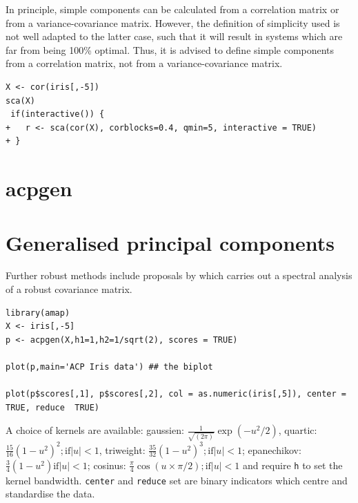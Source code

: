 In principle, simple components can be calculated from a correlation matrix or from a variance-covariance matrix. However, the definition of simplicity used is not well adapted to the latter case, such that it will result in systems which are far from being 100\% optimal. Thus, it is advised to define simple components from a correlation matrix, not from a variance-covariance matrix. 

\singlespacing
\begin{verbatim}
X <- cor(iris[,-5])
sca(X)
 if(interactive()) {
+   r <- sca(cor(X), corblocks=0.4, qmin=5, interactive = TRUE)
+ }
\end{verbatim}
\onehalfspacing

\section{acpgen}

\section{Generalised principal components}

Further robust methods include proposals by \cite{Caussinus+Ruiz-Gazen:1993} which carries out a spectral analysis of a robust covariance matrix.


\singlespacing
\begin{verbatim}
library(amap)
X <- iris[,-5]
p <- acpgen(X,h1=1,h2=1/sqrt(2), scores = TRUE)

plot(p,main='ACP Iris data') ## the biplot

plot(p$scores[,1], p$scores[,2], col = as.numeric(iris[,5]), center = TRUE, reduce  TRUE)
\end{verbatim}
\onehalfspacing


A choice of kernels are available: gaussien: $\frac{1}{\sqrt{(2\pi)}} \exp(-u^{2}/2)$, quartic: $\frac{15}{16} (1-u^{2})^{2};  \mbox{if} |u| < 1$, triweight: $\frac{35}{32} (1-u^{2})^{3}; \mbox{if} |u| < 1$; epanechikov: $\frac{3}{4} (1-u^{2}) \mbox{if} |u| < 1$; cosinus: $\frac{\pi}{4} \cos (u \times \pi/2); \mbox{if} |u| < 1$ and require \verb+h+ to set the kernel bandwidth.   \verb+center+ and \verb+reduce+ set are binary indicators which centre and standardise the data.   



%
%
%





